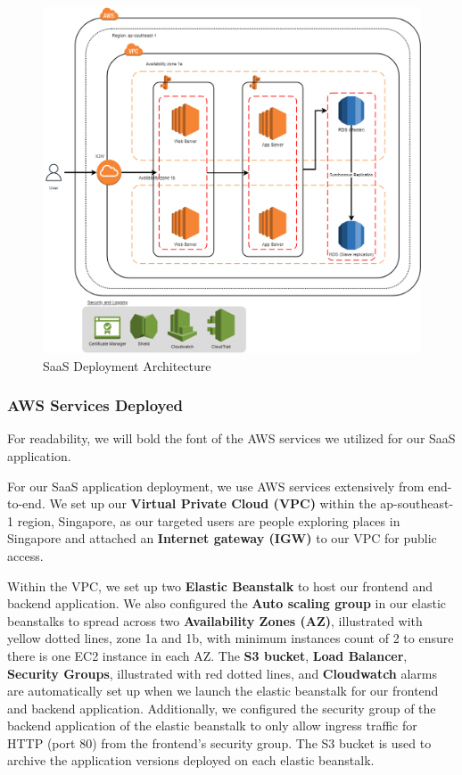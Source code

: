 \documentclass[12pt,a4paper]{article}
\begin{document}
    \begin{figure}[H]
    	\centering
    	\includegraphics[width=1\textwidth]{figures/final.drawio.png}
    	\caption{SaaS Deployment Architecture}
    	\label{deployment_architecture}
    \end{figure}
    
        \label{section-aws-services-deployed}
        \subsubsection{AWS Services Deployed}
        
        For readability, we will bold the font of the AWS services we utilized for our SaaS application.

        For our SaaS application deployment, we use AWS services extensively from end-to-end. We set up our \textbf{Virtual Private Cloud (VPC)} within the ap-southeast-1 region, Singapore, as our targeted users are people exploring places in Singapore and attached an \textbf{Internet gateway (IGW)} to our VPC for public access.
        
        Within the VPC, we set up two \textbf{Elastic Beanstalk} to host our frontend and backend application. We also configured the \textbf{Auto scaling group} in our elastic beanstalks to spread across two \textbf{Availability Zones (AZ)}, illustrated with yellow dotted lines, zone 1a and 1b, with minimum instances count of 2 to ensure there is one EC2 instance in each AZ. The \textbf{S3 bucket}, \textbf{Load Balancer}, \textbf{Security Groups}, illustrated with red dotted lines, and \textbf{Cloudwatch} alarms are automatically set up when we launch the elastic beanstalk for our frontend and backend application. Additionally, we configured the security group of the backend application of the elastic beanstalk to only allow ingress traffic for HTTP (port 80) from the frontend’s security group. The S3 bucket is used to archive the application versions deployed on each elastic beanstalk.
        
\end{document}
